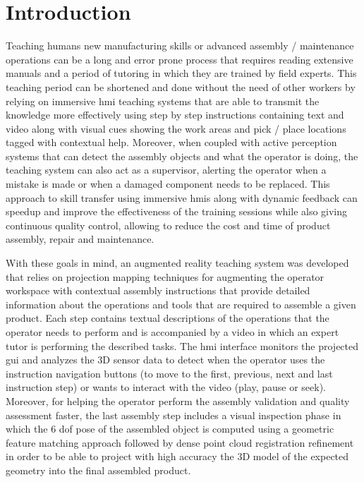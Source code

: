 \section{Introduction}\label{sec:introduction}

Teaching humans new manufacturing skills or advanced assembly / maintenance operations can be a long and error prone process that requires reading extensive manuals and a period of tutoring in which they are trained by field experts. This teaching period can be shortened and done without the need of other workers by relying on immersive \gls{hmi} teaching systems that are able to transmit the knowledge more effectively using step by step instructions containing text and video along with visual cues showing the work areas and pick / place locations tagged with contextual help. Moreover, when coupled with active perception systems that can detect the assembly objects and what the operator is doing, the teaching system can also act as a supervisor, alerting the operator when a mistake is made or when a damaged component needs to be replaced. This approach to skill transfer using immersive \glspl{hmi} along with dynamic feedback can speedup and improve the effectiveness of the training sessions while also giving continuous quality control, allowing to reduce the cost and time of product assembly, repair and maintenance.

With these goals in mind, an augmented reality teaching system was developed that relies on projection mapping techniques for augmenting the operator workspace with contextual assembly instructions that provide detailed information about the operations and tools that are required to assemble a given product. Each step contains textual descriptions of the operations that the operator needs to perform and is accompanied by a video in which an expert tutor is performing the described tasks. The \gls{hmi} interface monitors the projected \gls{gui} and analyzes the 3D sensor data to detect when the operator uses the instruction navigation buttons (to move to the first, previous, next and last instruction step) or wants to interact with the video (play, pause or seek). Moreover, for helping the operator perform the assembly validation and quality assessment faster, the last assembly step includes a visual inspection phase in which the 6 \gls{dof} pose of the assembled object is computed using a geometric feature matching approach followed by dense point cloud registration refinement in order to be able to project with high accuracy the 3D model of the expected geometry into the final assembled product.

